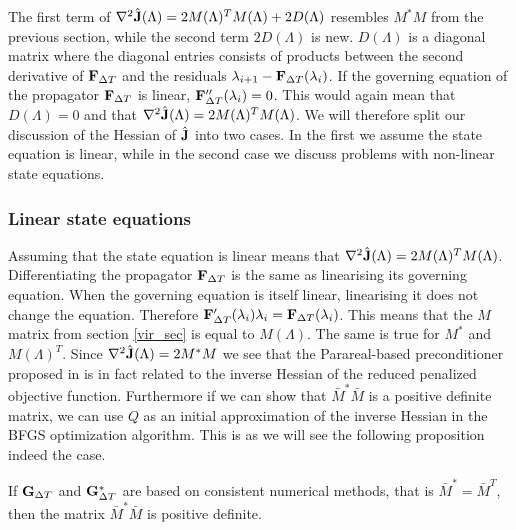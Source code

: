 \noindent
The first term of $\nabla^2 \hat{\bold J}(\Lambda)=2M(\Lambda)^TM(\Lambda) + 2D(\Lambda)$ resembles $M^*M$ from the previous section, while the second term $2D(\Lambda)$ is new. $D(\Lambda)$ is a diagonal matrix where the diagonal entries consists of products between the second derivative of $\bold F_ {\Delta T}$ and the residuals $\lambda_{i+1}-\bold F_{\Delta T}(\lambda_i)$. If the governing equation of the propagator $\bold F_ {\Delta T}$ is linear, $\bold F_{\Delta T}''(\lambda_i)=0$. This would again mean that $D(\Lambda)=0$ and that $\nabla^2 \hat{\bold J}(\Lambda)=2M(\Lambda)^TM(\Lambda)$. We will therefore split our discussion of the Hessian of $\hat{\bold J}$ into two cases. In the first we assume the state equation is linear, while in the second case we discuss problems with non-linear state equations.
\subsubsection{Linear state equations}
Assuming that the state equation is linear means that $\nabla^2 \hat{\bold J}(\Lambda)=2M(\Lambda)^TM(\Lambda)$. Differentiating the propagator $\bold F_{\Delta T}$ is the same as linearising its governing equation. When the governing equation is itself linear, linearising it does not change the equation. Therefore $\bold F_{\Delta T}'(\lambda_i)\lambda_i = \bold F_{\Delta T}(\lambda_i)$. This means that the $M$ matrix from section \ref{vir_sec} is equal to $M(\Lambda)$. The same is true for $M^*$ and $M(\Lambda)^T$. Since  $\nabla^2 \hat{\bold J}(\Lambda)=2M^*M$ we see that the Parareal-based preconditioner proposed in \cite{maday2002parareal} is in fact related to the inverse Hessian of the reduced penalized objective function. Furthermore if we can show that $\bar M^*\bar M$ is a positive definite matrix, we can use $Q$ as an initial approximation of the inverse Hessian in the BFGS optimization algorithm. This is as we will see the following proposition indeed the case.
\begin{proposition} \label{pos_def_prop}
If $\bold G_{\Delta T}$ and $\bold G_{\Delta T}^*$ are based on consistent numerical methods, that is $\bar M^*=\bar M^T$, then the matrix $\bar M^*\bar M$ is positive definite.
\end{proposition}
